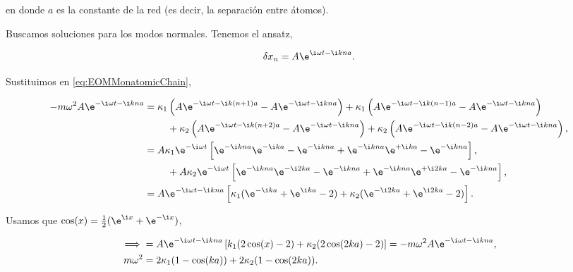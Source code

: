 \documentclass[./../main.tex]{subfiles}
\begin{document}
\begin{exercise}
\begin{enumerate}
            en donde \(a\) es la constante de la red (es decir, la separación entre átomos).

            \begin{solution}
                Buscamos soluciones para los modos normales. Tenemos el ansatz,

                \begin{equation*}
                    \fdif{x_{n}} = A\e^{\i\omega t - \i kna}.
                \end{equation*}

                Sustituimos en \cref{eq:EOMMonatomicChain},

                \begin{align*}
                    -m\omega^{2}A\e^{-\i\omega t - \i kna} &=
                    \begin{multlined}[t]
                        \kappa_{1}\left(A\e^{-\i\omega t - \i k(n + 1)a} - A\e^{-\i\omega t - \i kna}
                        \right)
                        + \kappa_{1}\left(A\e^{-\i\omega t -\i k(n - 1)a} - A\e^{-\i\omega t - \i kna}\right)\\
                        + \kappa_{2}\left(A\e^{-\i\omega t -\i k(n + 2)a} - A\e^{-\i\omega t - \i kna}\right)
                        + \kappa_{2}\left(A\e^{-\i\omega t - \i k(n - 2)a} - A\e^{-\i\omega t -\i kna}\right),
                    \end{multlined}\\
                    &= 
                    \begin{multlined}[t]
                        A\kappa_{1}\e^{-\i\omega t}\left[\e^{-\i kna}\e^{-\i ka} - \e^{-\i kna} + \e^{-\i kna}\e^{+\i ka} - \e^{-\i kna}\right],\\
                        + A\kappa_{2}\e^{-\i\omega t}\left[\e^{-\i kna}\e^{-\i2ka} - \e^{-\i kna} + \e^{-\i kna}\e^{+\i2ka} - \e^{-\i kna}\right],
                    \end{multlined}\\
                    &= A\e^{-\i\omega t - \i kna}\left[\kappa_{1}(\e^{-\i ka} + \e^{\i ka} - 2) + \kappa_{2}(\e^{-\i2ka} + \e^{\i2ka} - 2)\right].
                \end{align*}

                Usamos que \(\cos(x) = \tfrac{1}{2}(\e^{\i x} + \e^{-\i x})\),

                \begin{align*}
                    \implies &= A\e^{-\i\omega t - \i kna}\left[k_{1}(2\cos(x) - 2) + \kappa_{2}(2\cos(2ka) - 2)\right] = -m\omega^{2}A\e^{-\i\omega t - \i kna},\\
                    m\omega^{2} &= 2\kappa_{1}(1 - \cos(ka)) + 2\kappa_{2}(1 - \cos(2ka)).
                \end{align*}


\end{solution}
\end{enumerate}
\end{exercise}
\end{document}
